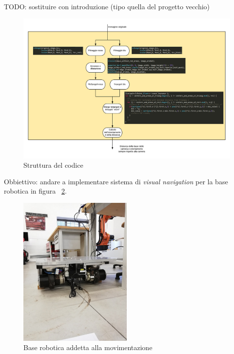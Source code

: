 TODO: sostituire con introduzione (tipo quella del progetto vecchio)

\begin{figure}
	\centering
	\includegraphics[width=\textwidth]{Immagini/CodeStructure.png}
	\caption{Struttura del codice}
	\label{fig:CodeStructure}
\end{figure}

Obbiettivo: andare a implementare sistema di \textit{visual navigation} per la base robotica in figura ~\ref{fig:BaseRobotica}.

\begin{figure}
	\centering
	\includegraphics[width=0.5\textwidth]{Immagini/BaseRobotica.jpg}
	\caption{Base robotica addetta alla movimentazione}
	\label{fig:BaseRobotica}
\end{figure}

